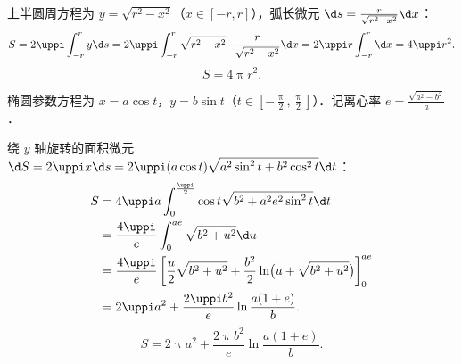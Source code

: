 \begin{solution}

    上半圆周方程为 $y = \sqrt{r^2 - x^2}$（$x \in [-r, r]$），弧长微元 $\d s = \frac{r}{\sqrt{r^2 - x^2}}\d x$：
    \begin{equation}
        S = 2\uppi \int_{-r}^r y \d s = 2\uppi \int_{-r}^r \sqrt{r^2 - x^2} \cdot \frac{r}{\sqrt{r^2 - x^2}}\d x = 2\uppi r \int_{-r}^r \d x = 4\uppi r^2.
    \end{equation}
    \begin{equation}
        \boxed{S = 4\uppi r^2.}
    \end{equation}


    椭圆参数方程为 $x = a\cos t$，$y = b\sin t$（$t \in \left[-\frac{\uppi}{2}, \frac{\uppi}{2}\right]$）．记离心率 $e = \frac{\sqrt{a^2 - b^2}}{a}$．

    绕 $y$ 轴旋转的面积微元 $\d S = 2\uppi x \d s = 2\uppi (a\cos t)\sqrt{a^2\sin^2 t + b^2\cos^2 t}\d t$：
    \begin{equation}
        \begin{aligned}
            S & = 4\uppi a \int_0^{\frac{\uppi}{2}} \cos t \sqrt{b^2 + a^2 e^2 \sin^2 t}\d t                                            \\
              & = \frac{4\uppi}{e} \int_0^{ae} \sqrt{b^2 + u^2}\d u                                                                     \\
              & = \frac{4\uppi}{e} \left[ \frac{u}{2}\sqrt{b^2 + u^2} + \frac{b^2}{2}\ln\bigl(u + \sqrt{b^2 + u^2}\bigr) \right]_0^{ae} \\
              & = 2\uppi a^2 + \frac{2\uppi b^2}{e}\ln\frac{a(1 + e)}{b}.
        \end{aligned}
    \end{equation}
    \begin{equation}
        \boxed{S = 2\uppi a^2 + \frac{2\uppi b^2}{e}\ln\frac{a(1 + e)}{b}.}
    \end{equation}



\end{solution}
